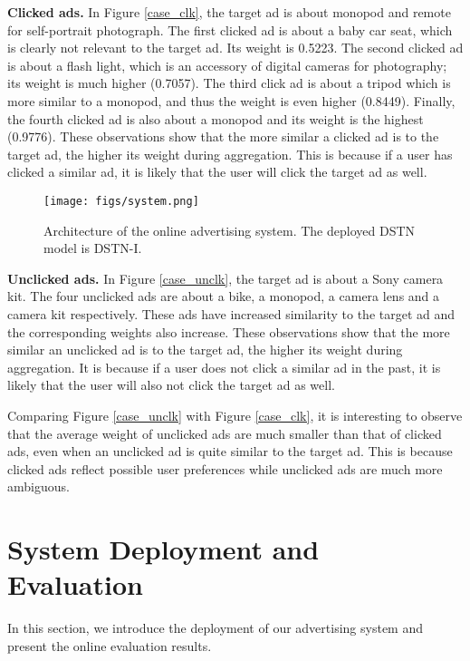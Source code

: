 \documentclass[sigconf]{acmart}
\begin{document}
\textbf{Clicked ads.} In Figure \ref{case_clk}, the target ad is about monopod and remote for self-portrait photograph. The first clicked ad is about a baby car seat, which is clearly not relevant to the target ad. Its weight is 0.5223. The second clicked ad is about a flash light, which is an accessory of digital cameras for photography; its weight is much higher (0.7057). The third click ad is about a tripod which is more similar to a monopod, and thus the weight is even higher (0.8449). Finally, the fourth clicked ad is also about a monopod and its weight is the highest (0.9776). These observations show that the more similar a clicked ad is to the target ad, the higher its weight during aggregation. This is because if a user has clicked a similar ad, it is likely that the user will click the target ad as well.

\begin{figure}[!t]
\centering
\texttt{[image: figs/system.png]}
\vskip -8pt
\caption{Architecture of the online advertising system. The deployed DSTN model is DSTN-I.}
\vskip -11pt
\label{server}
\end{figure}

\textbf{Unclicked ads.} In Figure \ref{case_unclk}, the target ad is about a Sony camera kit. The four unclicked ads are about a bike, a monopod, a camera lens and a camera kit respectively. These ads have increased similarity to the target ad and the corresponding weights also increase. These observations show that the more similar an unclicked ad is to the target ad, the higher its weight during aggregation. It is because if a user does not click a similar ad in the past, it is likely that the user will also not click the target ad as well.

Comparing Figure \ref{case_unclk} with Figure \ref{case_clk}, it is interesting to observe that the average weight of unclicked ads are much smaller than that of clicked ads, even when an unclicked ad is quite similar to the target ad. This is because clicked ads reflect possible user preferences while unclicked ads are much more ambiguous.

\section{System Deployment and Evaluation}
In this section, we introduce the deployment of our advertising system and present the online evaluation results.
\end{document}
